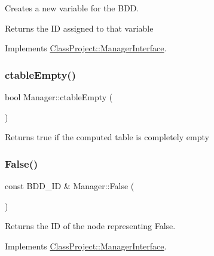 Creates a new variable for the B\+DD. \begin{DoxyReturn}{Returns}
the ID assigned to that variable 
\end{DoxyReturn}


Implements \hyperlink{classClassProject_1_1ManagerInterface_ab101acd3fbe6a5e29973d88f9862b8b4}{Class\+Project\+::\+Manager\+Interface}.

\mbox{\label{classClassProject_1_1Manager_a8be64b55798d49545a549266ae1e9281}} 
\subsubsection{\texorpdfstring{ctable\+Empty()}{ctableEmpty()}}
{\footnotesize\ttfamily bool Manager\+::ctable\+Empty (\begin{DoxyParamCaption}{ }\end{DoxyParamCaption})}

\begin{DoxyReturn}{Returns}
true if the computed table is completely empty 
\end{DoxyReturn}
\mbox{\label{classClassProject_1_1Manager_ae9bae01509e6063313024cd85a8eb569}} 
\subsubsection{\texorpdfstring{False()}{False()}}
{\footnotesize\ttfamily const B\+D\+D\+\_\+\+ID \& Manager\+::\+False (\begin{DoxyParamCaption}{ }\end{DoxyParamCaption})\hspace{0.3cm}{\ttfamily [virtual]}}

\begin{DoxyReturn}{Returns}
the ID of the node representing False. 
\end{DoxyReturn}


Implements \hyperlink{classClassProject_1_1ManagerInterface_a98d18e1bc840fd664af015facfdcf690}{Class\+Project\+::\+Manager\+Interface}.

